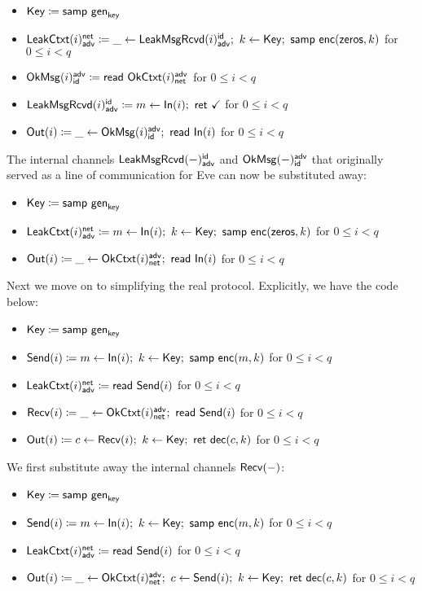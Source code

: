 \begin{itemize}
\item $\mathsf{Key} \coloneqq \mathsf{samp} \ \mathsf{gen}_{\mathsf{key}}$
\item $\LeakCtxt(i)^\net_\adv \coloneqq \_ \leftarrow \LeakMsgRcvd(i)^\id_\adv; \ k \leftarrow \Key; \ \samp{\enc(\zeros,k)}$ for $0 \leq i < q$
\item $\mathsf{OkMsg}(i)^{\mathsf{adv}}_{\mathsf{id}} \coloneqq \mathsf{read} \ \mathsf{OkCtxt}(i)^{\mathsf{adv}}_{\mathsf{net}}$ for $0 \leq i < q$
\item $\mathsf{LeakMsgRcvd}(i)^{\mathsf{id}}_{\mathsf{adv}} \coloneqq m \leftarrow \mathsf{In}(i); \ \mathsf{ret} \ \checkmark$ for $0 \leq i < q$
\item $\mathsf{Out}(i) \coloneqq \_ \leftarrow \mathsf{OkMsg}(i)^{\mathsf{adv}}_{\mathsf{id}}; \ \mathsf{read} \ \mathsf{In}(i)$ for $0 \leq i < q$
\end{itemize}

\noindent The internal channels $\mathsf{LeakMsgRcvd}(-)^{\mathsf{id}}_{\mathsf{adv}}$ and $\mathsf{OkMsg}(-)^{\mathsf{adv}}_{\mathsf{id}}$ that originally served as a line of communication for Eve can now be substituted away:

\begin{itemize}
\item $\mathsf{Key} \coloneqq \mathsf{samp} \ \mathsf{gen}_{\mathsf{key}}$
\item $\mathsf{LeakCtxt}(i)^{\mathsf{net}}_{\mathsf{adv}} \coloneqq m \leftarrow \mathsf{In}(i); \ k \leftarrow \mathsf{Key}; \ \mathsf{samp} \ \mathsf{enc}(\mathsf{zeros},k)$ for $0 \leq i < q$
\item $\mathsf{Out}(i) \coloneqq \_ \leftarrow \mathsf{OkCtxt}(i)^{\mathsf{adv}}_{\mathsf{net}}; \ \mathsf{read} \ \mathsf{In}(i)$ for $0 \leq i < q$
\end{itemize}

\noindent Next we move on to simplifying the real protocol. Explicitly, we have the code below:

\begin{itemize}
\item $\mathsf{Key} \coloneqq \mathsf{samp} \ \mathsf{gen}_{\mathsf{key}}$
\item $\mathsf{Send}(i) \coloneqq m \leftarrow \mathsf{In}(i); \ k \leftarrow \mathsf{Key}; \ \mathsf{samp} \ \mathsf{enc}(m,k)$ for $0 \leq i < q$
\item $\mathsf{LeakCtxt}(i)^{\mathsf{net}}_{\mathsf{adv}} \coloneqq \mathsf{read} \ \mathsf{Send}(i)$ for $0 \leq i < q$
\item $\mathsf{Recv}(i) \coloneqq \_ \leftarrow \mathsf{OkCtxt}(i)^{\mathsf{adv}}_{\mathsf{net}}; \ \mathsf{read} \ \mathsf{Send}(i)$ for $0 \leq i < q$
\item $\mathsf{Out}(i) \coloneqq c \leftarrow \mathsf{Recv}(i); \ k \leftarrow \mathsf{Key}; \ \mathsf{ret} \ \mathsf{dec}(c,k)$ for $0 \leq i < q$
\end{itemize}

\noindent We first substitute away the internal channels $\mathsf{Recv}(-)$:

\begin{itemize}
\item $\mathsf{Key} \coloneqq \mathsf{samp} \ \mathsf{gen}_{\mathsf{key}}$
\item $\mathsf{Send}(i) \coloneqq m \leftarrow \mathsf{In}(i); \ k \leftarrow \mathsf{Key}; \ \mathsf{samp} \ \mathsf{enc}(m,k)$ for $0 \leq i < q$
\item $\mathsf{LeakCtxt}(i)^{\mathsf{net}}_{\mathsf{adv}} \coloneqq \mathsf{read} \ \mathsf{Send}(i)$ for $0 \leq i < q$
\item {\color{red} $\Out(i) \coloneqq \_ \leftarrow \OkCtxt(i)^\adv_\net; \ c \leftarrow \Send(i); \ k \leftarrow \Key; \ \ret{\dec(c,k)}$ for $0 \leq i < q$}
\end{itemize}

